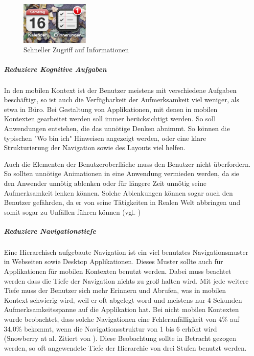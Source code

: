 \begin{figure}
	\begin{center}
	
	\includegraphics[width=0.3\textwidth]{img/iconIos.png}
	\caption{Schneller Zugriff auf Informationen}\label{fig:iconIos}
\end{center}
\end{figure}

\subparagraph{Reduziere Kognitive Aufgaben} 
\label{subp:reduziere_kognitive_aufgaben_}

In den mobilen Kontext ist der Benutzer meistens mit verschiedene Aufgaben beschäftigt, so ist auch die Verfügbarkeit der Aufmerksamkeit viel weniger, als etwa in Büro. Bei Gestaltung von Applikationen, mit denen in mobilen Kontexten gearbeitet werden soll immer berücksichtigt werden. So soll Anwendungen entstehen, die das unnötige Denken abnimmt. So können die typischen "Wo bin ich" Hinweisen angezeigt werden, oder eine klare Strukturierung der Navigation sowie des Layouts viel helfen. 

Auch die Elementen der Benutzeroberfläche muss den Benutzer nicht überfordern. So sollten unnötige Animationen in eine Anwendung vermieden werden, da sie den Anwender unnötig ablenken oder für längere Zeit unnötig seine Aufmerksamkeit lenken können. Solche Ablenkungen können sogar auch den Benutzer gefährden, da er von seine Tätigkeiten in Realen Welt abbringen und somit sogar zu Unfällen führen können (vgl. \cite{Nasar:2008cc})

\subparagraph{Reduziere Navigationstiefe} 
\label{subp:reduziere_das_w_hlen}

Eine Hierarchisch aufgebaute Navigation ist ein viel benutztes Navigationsmuster in Webseiten sowie Desktop Applikationen. Dieses Muster sollte auch für Applikationen für mobilen Kontexten benutzt werden. Dabei muss beachtet werden dass die Tiefe der Navigation nichts zu groß halten wird. Mit jede weitere Tiefe muss der Benutzer sich mehr Erinnern und Abrufen, was in mobilen Kontext schwierig wird, weil er oft abgelegt word und meistens nur 4 Sekunden Aufmerksamkeitsspanne auf die Applikation hat\cite{Oulasvirta:2005vn}. Bei nicht mobilen Kontexten wurde beobachtet, dass solche Navigationen eine Fehleranfälligkeit von 4\% auf 34.0\% bekommt, wenn die Navigationsstruktur von 1 bis 6 erhöht wird (Snowberry at al. Zitiert von \cite{Chae:2004gp}). Diese Beobachtung sollte in Betracht gezogen werden, so oft angewendete Tiefe der Hierarchie von drei Stufen benutzt werden.


